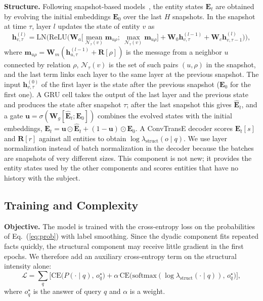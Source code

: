 \documentclass[runningheads]{llncs}
\newcommand{\lam}{\lambda}
\newcommand{\para}[1]{\smallskip\noindent\textbf{#1}}
\begin{document}
\para{Structure.} Following snapshot-based models~\cite{li2021regcn,dong2025dimnet}, the entity states $\mathbf{E}_t$ are obtained by evolving the initial embeddings $\mathbf{E}_0$ over the last $H$ snapshots. In the snapshot at time $\tau$, layer $l$ updates the state of entity $v$ as
\begin{equation}
  \mathbf{h}^{(l)}_{v,\tau} = \mathrm{LN}\Big(\mathrm{ReLU}\big(\mathbf{W}_a\big[\operatorname*{mean}_{\mathcal{N}_\tau(v)} \mathbf{m}_{u\rho};\ \max_{\mathcal{N}_\tau(v)} \mathbf{m}_{u\rho}\big] + \mathbf{W}_0 \mathbf{h}^{(l-1)}_{v,\tau} + \mathbf{W}_c \mathbf{h}^{(l)}_{v,\tau-1}\big)\Big),
\end{equation}
where $\mathbf{m}_{u\rho} = \mathbf{W}_m(\mathbf{h}^{(l-1)}_{u,\tau} + \mathbf{R}[\rho])$ is the message from a neighbor $u$ connected by relation $\rho$, $\mathcal{N}_\tau(v)$ is the set of such pairs $(u, \rho)$ in the snapshot, and the last term links each layer to the same layer at the previous snapshot. The input $\mathbf{h}^{(0)}_{v,\tau}$ of the first layer is the state after the previous snapshot ($\mathbf{E}_0$ for the first one). A GRU cell takes the output of the last layer and the previous state and produces the state after snapshot $\tau$; after the last snapshot this gives $\hat{\mathbf{E}}_t$, and a gate $\mathbf{u} = \sigma(\mathbf{W}_g[\hat{\mathbf{E}}_t; \mathbf{E}_0])$ combines the evolved states with the initial embeddings, $\mathbf{E}_t = \mathbf{u} \odot \hat{\mathbf{E}}_t + (1 - \mathbf{u}) \odot \mathbf{E}_0$. A ConvTransE decoder scores $\mathbf{E}_t[s]$ and $\mathbf{R}[r]$ against all entities to obtain $\log\lam_{\mathrm{struct}}(o \mid q)$. We use layer normalization instead of batch normalization in the decoder because the batches are snapshots of very different sizes. This component is not new; it provides the entity states used by the other components and scores entities that have no history with the subject.

\subsection{Training and Complexity}

\para{Objective.} The model is trained with the cross-entropy loss on the probabilities of Eq.~(\ref{eq:prob}) with label smoothing. Since the dyadic component fits repeated facts quickly, the structural component may receive little gradient in the first epochs. We therefore add an auxiliary cross-entropy term on the structural intensity alone:
\begin{equation}
  \mathcal{L} = \sum_{q} \Big[\mathrm{CE}\big(P(\cdot \mid q),\, o^\star_q\big) + \alpha\, \mathrm{CE}\big(\mathrm{softmax}(\log\lam_{\mathrm{struct}}(\cdot \mid q)),\, o^\star_q\big)\Big],
\end{equation}
where $o^\star_q$ is the answer of query $q$ and $\alpha$ is a weight.
\end{document}
